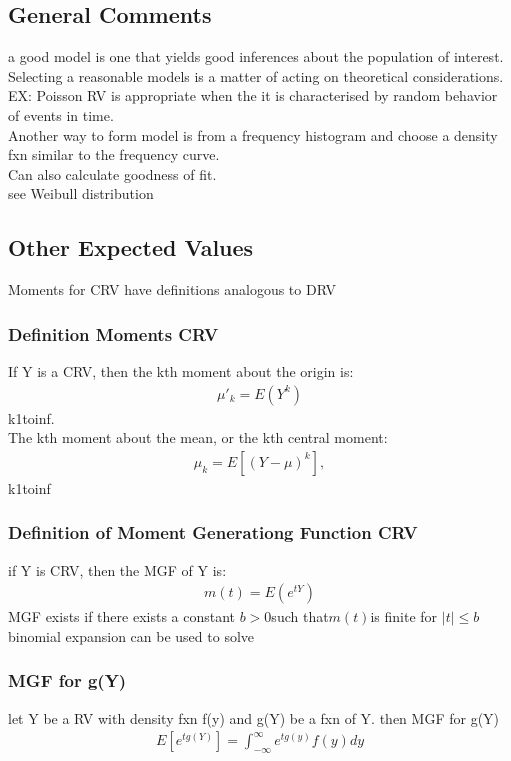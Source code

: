 \documentclass[12pt]{article}
\begin{document}
\subsection{General Comments}
    a good model is one that yields good inferences about the population of
    interest. Selecting a reasonable models is a matter of acting on 
    theoretical considerations. EX: Poisson RV is appropriate when the 
    it is characterised by random behavior of events in time.\\
    Another way to form model is from a frequency histogram and choose a
    density fxn similar to the frequency curve.\\
    Can also calculate goodness of fit.\\
    see Weibull distribution
\subsection{Other Expected Values}
    Moments for CRV have definitions analogous to DRV
    \subsubsection{Definition Moments CRV}
        If Y is a CRV, then the kth moment about the origin is:
        \begin{align*}
            \mu'_{k} = E(Y^{k})
        \end{align*}
        k1toinf.\\ 
        The kth moment about the mean, or the kth central moment:
        \begin{align*}
            \mu_{k} = E[(Y-\mu)^{k}],
        \end{align*}
        k1toinf
    \subsubsection{Definition of Moment Generationg Function CRV}
        if Y is CRV, then the MGF of Y is:
        \begin{align*}
            m(t) = E(e^{tY})
        \end{align*}
        MGF exists if there exists a constant $ b>0 $such that$ m(t) $is
        finite for $ |t|\le b $\\
        binomial expansion can be used to solve
    \subsubsection{MGF for g(Y)}
        let Y be a RV with density fxn f(y) and g(Y) be a fxn
        of Y. then MGF for g(Y)
        \begin{align*}
            E[e^{tg(Y)}] = \int_{-\infty }^{\infty }e^{tg(y)}f(y)dy
        \end{align*}
\end{document}
